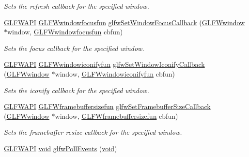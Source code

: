 \begin{DoxyCompactItemize}
\begin{DoxyCompactList}\small\item\em Sets the refresh callback for the specified window. \end{DoxyCompactList}\item 
\hyperlink{glfw3_8h_a56da5036b2cc259351ae22fd6439bb47}{G\-L\-F\-W\-A\-P\-I} \hyperlink{group__window_ga6b5f973531ea91663ad707ba4f2ac104}{G\-L\-F\-Wwindowfocusfun} \hyperlink{group__window_gac89c6534ba7fbab6f6c68b855656c0d4}{glfw\-Set\-Window\-Focus\-Callback} (\hyperlink{group__window_ga3c96d80d363e67d13a41b5d1821f3242}{G\-L\-F\-Wwindow} $\ast$window, \hyperlink{group__window_ga6b5f973531ea91663ad707ba4f2ac104}{G\-L\-F\-Wwindowfocusfun} cbfun)
\begin{DoxyCompactList}\small\item\em Sets the focus callback for the specified window. \end{DoxyCompactList}\item 
\hyperlink{glfw3_8h_a56da5036b2cc259351ae22fd6439bb47}{G\-L\-F\-W\-A\-P\-I} \hyperlink{group__window_gae47ae066eea9fe6050a62360928ae524}{G\-L\-F\-Wwindowiconifyfun} \hyperlink{group__window_ga17cd86946117b56c76397530900519db}{glfw\-Set\-Window\-Iconify\-Callback} (\hyperlink{group__window_ga3c96d80d363e67d13a41b5d1821f3242}{G\-L\-F\-Wwindow} $\ast$window, \hyperlink{group__window_gae47ae066eea9fe6050a62360928ae524}{G\-L\-F\-Wwindowiconifyfun} cbfun)
\begin{DoxyCompactList}\small\item\em Sets the iconify callback for the specified window. \end{DoxyCompactList}\item 
\hyperlink{glfw3_8h_a56da5036b2cc259351ae22fd6439bb47}{G\-L\-F\-W\-A\-P\-I} \hyperlink{group__window_ga311bb32e578aa240b6464af494debffc}{G\-L\-F\-Wframebuffersizefun} \hyperlink{group__window_gad766bcdb4465f9c6c62e5d8ca7cfba56}{glfw\-Set\-Framebuffer\-Size\-Callback} (\hyperlink{group__window_ga3c96d80d363e67d13a41b5d1821f3242}{G\-L\-F\-Wwindow} $\ast$window, \hyperlink{group__window_ga311bb32e578aa240b6464af494debffc}{G\-L\-F\-Wframebuffersizefun} cbfun)
\begin{DoxyCompactList}\small\item\em Sets the framebuffer resize callback for the specified window. \end{DoxyCompactList}\item 
\hyperlink{glfw3_8h_a56da5036b2cc259351ae22fd6439bb47}{G\-L\-F\-W\-A\-P\-I} \hyperlink{wglew_8h_aeea6e3dfae3acf232096f57d2d57f084}{void} \hyperlink{group__window_ga872d16e4c77f58c0436f356255920cfc}{glfw\-Poll\-Events} (\hyperlink{wglew_8h_aeea6e3dfae3acf232096f57d2d57f084}{void})

\end{DoxyCompactItemize}
